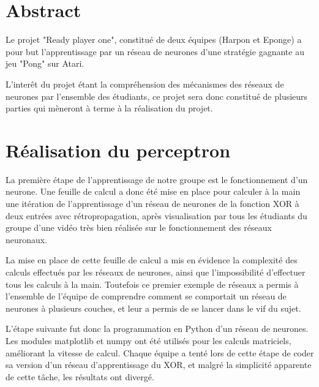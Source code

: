 \documentclass[
    10pt,
    a4paper,
    oneside,
    headinclude,footinclude,
    BCOR=5mm,
]{scrartcl}
\title{\normalfont{\spacedallcaps{Ready-Player-One}}}
\subtitle{Rapport du groupe Harpon}
\author{Martin Lehoux, Pierre Biret \and Sacha Seksik, Loïc Audoin}
\date{\today}
\begin{document}
    
\renewcommand{\sectionmark}[1]{\markright{\spacedlowsmallcaps{#1}}}
\lehead{\mbox{\llap{\small\thepage\kern1em\color{halfgray} \vline}\color{halfgray}\hspace{0.5em}\rightmark\hfil}}
\pagestyle{scrheadings}

\maketitle

\section*{Abstract}
Le projet "Ready player one", constitué de deux équipes (Harpon et Eponge) a pour but l'apprentissage par un réseau de neurones d'une stratégie gagnante au jeu "Pong" sur Atari.

L'interêt du projet étant la compréhension des mécanismes des réseaux de neurones par l'ensemble des étudiants, ce projet sera donc constitué de plusieurs parties qui mèneront à terme à la réalisation du projet.



\newpage
\section{Réalisation du perceptron}

La première étape de l'apprentissage de notre groupe est le fonctionnement d'un neurone. Une feuille de calcul a donc été mise en place pour calculer à la main une itération de l'apprentissage d'un réseau de neurones de la fonction XOR à deux entrées avec rétropropagation, après visualisation par tous les étudiants du groupe d'une vidéo très bien réalisée sur le fonctionnement des réseaux neuronaux.

La mise en place de cette feuille de calcul a mis en évidence la complexité des calculs effectués par les réseaux de neurones, ainsi que l'impossibilité d'effectuer tous les calculs à la main. Toutefois ce premier exemple de réseaux a permis à l'ensemble de l'équipe de comprendre comment se comportait un réseau de neurones à plusieurs couches, et leur a permis de se lancer dans le vif du sujet. 

L'étape suivante fut donc la programmation en Python d'un réseau de neurones. Les modules matplotlib et numpy ont été utilisés pour les calculs matriciels, améliorant la vitesse de calcul. Chaque équipe a tenté lors de cette étape de coder sa version d'un réseau d'apprentissage du XOR, et malgré la simplicité apparente de cette tâche, les résultats ont divergé.
\end{document}
